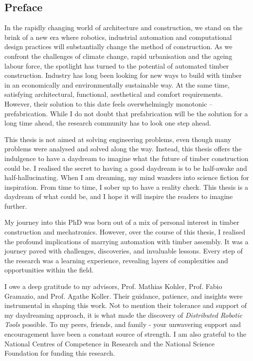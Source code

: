 \begin{adjustwidth}{20mm}{20mm}
\chapter*{Preface}

In the rapidly changing world of architecture and construction, we stand on the brink of a new era where robotics, industrial automation and computational design practices will substantially change the method of construction. As we confront the challenges of climate change, rapid urbanisation and the ageing labour force, the spotlight has turned to the potential of automated timber construction. Industry has long been looking for new ways to build with timber in an economically and environmentally sustainable way. At the same time, satisfying architectural, functional, aesthetical and comfort requirements. However, their solution to this date feels overwhelmingly monotonic -- prefabrication. While I do not doubt that prefabrication will be the solution for a long time ahead, the research community has to look one step ahead.

This thesis is not aimed at solving engineering problems, even though many problems were analysed and solved along the way. Instead, this thesis offers the indulgence to have a daydream to imagine what the future of timber construction could be. I realised the secret to having a good daydream is to be half-awake and half-hallucinating. When I am dreaming, my mind wanders into science fiction for inspiration. From time to time, I sober up to have a reality check. This thesis is a daydream of what could be, and I hope it will inspire the readers to imagine further.

My journey into this PhD was born out of a mix of personal interest in timber construction and mechatronics. However, over the course of this thesis, I realised the profound implications of marrying automation with timber assembly. It was a journey paved with challenges, discoveries, and invaluable lessons. Every step of the research was a learning experience, revealing layers of complexities and opportunities within the field.

I owe a deep gratitude to my advisors, Prof. Mathias Kohler, Prof. Fabio Gramazio, and Prof. Agathe Koller. Their guidance, patience, and insights were instrumental in shaping this work. Not to mention their tolerance and support of my daydreaming approach, it is what made the discovery of \textit{Distributed Robotic Tools} possible. To my peers, friends, and family - your unwavering support and encouragement have been a constant source of strength. I am also grateful to the National Centres of Competence in Research and the National Science Foundation for funding this research.


\end{adjustwidth}

